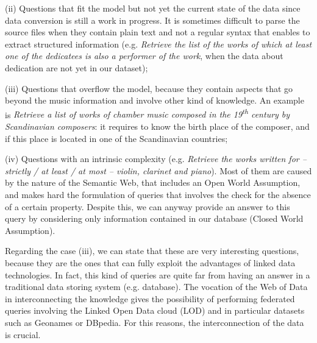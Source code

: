 (ii) Questions that fit the model but not yet the current state of the data since data conversion is still a work in progress. It is sometimes difficult to parse the source files when they contain plain text and not a regular syntax that enables to extract structured information (e.g. \textit{Retrieve the list of the works of which at least one of the dedicatees is also a performer of the work}, when the data about dedication are not yet in our dataset);

(iii) Questions that overflow the model, because they contain aspects that go beyond the music information and involve other kind of knowledge. An example is \textit{Retrieve a list of works of chamber music composed in the 19\textsuperscript{th} century by Scandinavian composers}: it requires to know the birth place of the composer, and if this place is located in one of the Scandinavian countries;

(iv) Questions with an intrinsic complexity (e.g. \textit{Retrieve the works written for -- strictly / at least / at most -- violin, clarinet and piano}). Most of them are caused by the nature of the Semantic Web, that includes an Open World Assumption, and makes hard the formulation of queries that involves the check for the absence of a certain property. Despite this, we can anyway provide an answer to this query by considering only information contained in our database (Closed World Assumption).

Regarding the case (iii), we can state that these are very interesting questions, because they are the ones that can fully exploit the advantages of linked data technologies. In fact, this kind of queries are quite far from having an answer in a traditional data storing system (e.g. database). The vocation of the Web of Data in interconnecting the knowledge gives the possibility of performing federated queries involving the Linked Open Data cloud (LOD) and in particular datasets such as Geonames or DBpedia. For this reasons, the interconnection of the data is crucial. 

